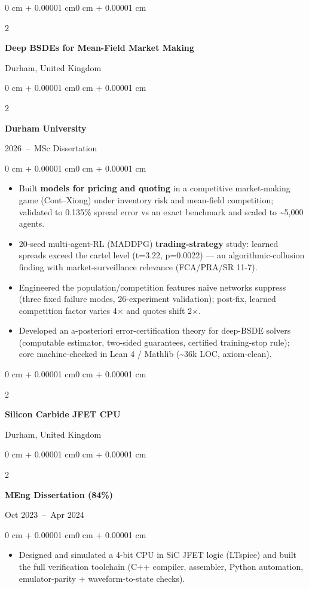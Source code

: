 \documentclass[10pt, letterpaper]{article}
\newenvironment{highlights}{
    \begin{itemize}[
        topsep=0.10 cm,
        parsep=0.10 cm,
        partopsep=0pt,
        itemsep=0pt,
        leftmargin=0 cm + 10pt
    ]
}{
    \end{itemize}
}
\newenvironment{onecolentry}{
    \begin{adjustwidth}{0 cm + 0.00001 cm}{0 cm + 0.00001 cm}
}{
    \end{adjustwidth}
}
\newenvironment{twocolentry}[2][]{
    \onecolentry{}
    \def\secondColumn{#2}
    \setcolumnwidth{\fill, 4.5 cm}
    \begin{paracol}{2}
}{
    \switchcolumn{} \raggedleft{} \secondColumn{}
    \end{paracol}
    \endonecolentry{}
}
\begin{document}
\begin{twocolentry}
  {Durham, United Kingdom}
  \textbf{Deep BSDEs for Mean-Field Market Making}
\end{twocolentry}
\begin{twocolentry}
  {2026~--~MSc Dissertation}
  \textbf{Durham University}
\end{twocolentry}
\vspace{0.10 cm}
\begin{onecolentry}
  \begin{highlights}
    \item Built \textbf{models for pricing and quoting} in a competitive market-making game (Cont--Xiong) under inventory risk and mean-field competition; validated to 0.135\% spread error vs an exact benchmark and scaled to \textasciitilde5{,}000 agents.
    \item 20-seed multi-agent-RL (MADDPG) \textbf{trading-strategy} study: learned spreads exceed the cartel level (t=3.22, p=0.0022) --- an algorithmic-collusion finding with market-surveillance relevance (FCA/PRA/SR 11-7).
    \item Engineered the population/competition features naive networks suppress (three fixed failure modes, 26-experiment validation); post-fix, learned competition factor varies 4$\times$ and quotes shift 2$\times$.
    \item Developed an a-posteriori error-certification theory for deep-BSDE solvers (computable estimator, two-sided guarantees, certified training-stop rule); core machine-checked in Lean 4 / Mathlib (\textasciitilde36k LOC, axiom-clean).
  \end{highlights}
\end{onecolentry}

\vspace{0.08 cm}

\begin{twocolentry}
  {Durham, United Kingdom}
  \textbf{Silicon Carbide JFET CPU}
\end{twocolentry}
\begin{twocolentry}
  {Oct 2023~--~Apr 2024}
  \textbf{MEng Dissertation (84\%)}
\end{twocolentry}
\vspace{0.10 cm}
\begin{onecolentry}
  \begin{highlights}
    \item Designed and simulated a 4-bit CPU in SiC JFET logic (LTspice) and built the full verification toolchain (C++ compiler, assembler, Python automation, emulator-parity + waveform-to-state checks).
  \end{highlights}
\end{onecolentry}
\end{document}

